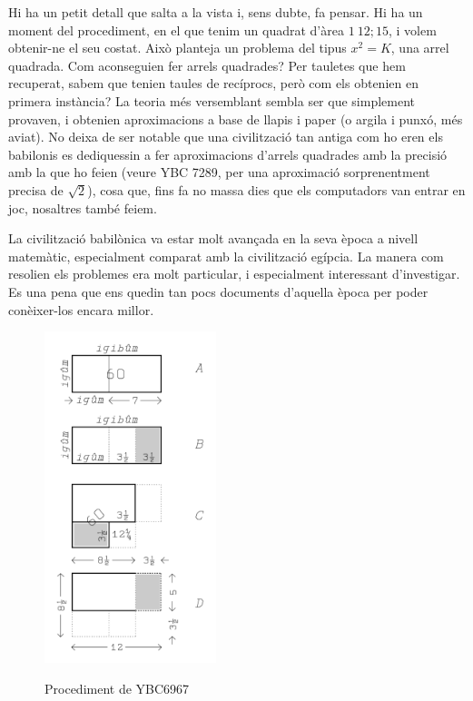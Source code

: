 \documentclass[a4paper, 11pt]{article}
\begin{document}
Hi ha un petit detall que salta a la vista i, sens dubte, fa pensar. Hi ha un moment del procediment, en el que tenim
un quadrat d'àrea $1\ 12;15$, i volem obtenir-ne el seu costat. Això planteja un problema del tipus $x^2 = K$, una
arrel quadrada. Com aconseguien fer arrels quadrades? Per tauletes que hem recuperat, sabem que tenien taules de
recíprocs, però com els obtenien en primera instància? La teoria més versemblant sembla ser que simplement provaven, i
obtenien aproximacions a base de llapis i paper (o argila i punxó, més aviat). No deixa de ser notable que una
civilització tan antiga com ho eren els babilonis es dediquessin a fer aproximacions d'arrels quadrades amb la precisió
amb la que ho feien (veure YBC 7289, per una aproximació sorprenentment precisa de $\sqrt{2}$), cosa que, fins fa no
massa dies que els computadors van entrar en joc, nosaltres també feiem.

La civilització babilònica va estar molt avançada en la seva època a nivell matemàtic, especialment comparat amb la
civilització egípcia. La manera com resolien els problemes era molt particular, i especialment interessant
d'investigar. Es una pena que ens quedin tan pocs documents d'aquella època per poder conèixer-los encara millor.

\begin{figure}[H]
  \centering
  \includegraphics[width=5cm]{figura1.png}
  \caption{Procediment de YBC6967}\cite{bib:fig:proc}\label{fig:proc}
\end{figure}

\printbibliography{}
\end{document}
